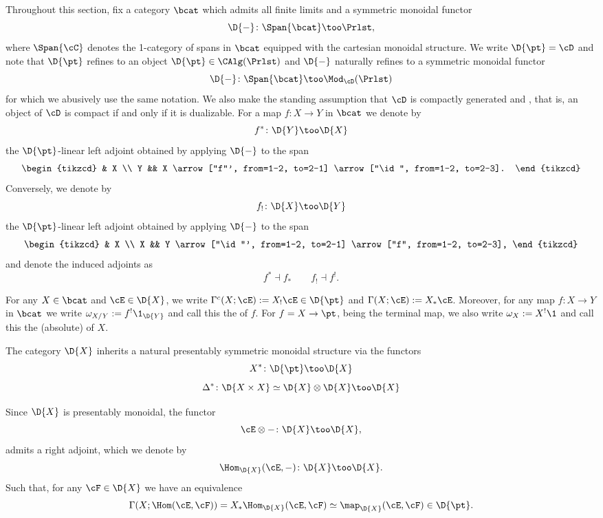 
Throughout this section, fix a category $\bcat$ which admits all finite limits
and a symmetric monoidal functor
\[ \D{-} \colon \Span{\bcat} \too \Prlst,\] where $\Span{\cC}$ denotes the 1-category
of spans in $\bcat$ equipped with the cartesian monoidal structure.
We write $\D{\pt}=\cD$ and note that $\D{\pt}$ refines to an object
$\D{\pt} \in \CAlg(\Prlst)$ and $\D{-}$ naturally refines to a symmetric monoidal functor
\[ \D{-} \colon \Span{\bcat} \too \Mod_{\cD}(\Prlst)\] for which we abusively use
the same notation. We also make the standing assumption that $\cD$ is compactly
generated and , that is, an object of $\cD$ is compact if and only
if it is dualizable.
For a map $f\colon X\to Y$ in $\bcat$ we denote by
\[ f^{\ast}\colon \D{Y} \too \D{X}\] the $\D{\pt}$-linear left adjoint obtained by
applying $\D{-}$ to the span
\[\begin{tikzcd}
    & X \\
    Y && X \arrow["f"', from=1-2, to=2-1] \arrow["\id", from=1-2, to=2-3].
  \end{tikzcd}\] Conversely, we denote by
\[ f_{!}\colon \D{X} \too \D{Y}\] the $\D{\pt}$-linear left adjoint obtained by
applying $\D{-}$ to the span
\[\begin{tikzcd}
    & X \\
    X && Y \arrow["\id"', from=1-2, to=2-1] \arrow["f", from=1-2, to=2-3],
  \end{tikzcd}\] and denote the induced adjoints as
\[ f^{\ast}\dashv f_{\ast} \qquad f_{!} \dashv f^{!}.\]
\begin{defn}
  For any $X\in \bcat$ and $\cE\in \D{X}$, we write
  $\Gamma^{c}(X;\cE):=X_{!}\cE \in \D{\pt}$ and $\Gamma(X;\cE):= X_{\ast}\cE$. Moreover, for
  any map $f\colon X\to Y$ in $\bcat$ we write $\omega_{X/Y}:= f^{!}\1_{\D{Y}}$ and call
  this the  of $f$. For $f=X\to \pt$, being the
  terminal map, we also write $\omega_{X}:=X^{!}\1$ and call this the (absolute)
   of $X$.
\end{defn}

\begin{rmk}
  The category $\D{X}$ inherits a natural presentably symmetric monoidal
  structure via the functors
  \[ X^{\ast}\colon \D{\pt} \too \D{X}\]
  \[ \Delta^{\ast}\colon \D{X \times X} \simeq \D{X} \otimes \D{X} \too \D{X}\]
\end{rmk}
Since $\D{X}$ is presentably monoidal, the functor
\[ \cE \otimes - \colon \D{X} \too \D{X},\] admits a right adjoint, which we denote by
\[ \Hom_{\D{X}}(\cE, -) \colon \D{X} \too \D{X}.\] Such that, for any $\cF\in \D{X}$ we
have an equivalence
\[ \Gamma(X;\Hom(\cE,\cF))=X_{\ast} \Hom_{\D{X}}(\cE, \cF) \simeq \map_{\D{X}}(\cE,\cF) \in \D{\pt}. \]

